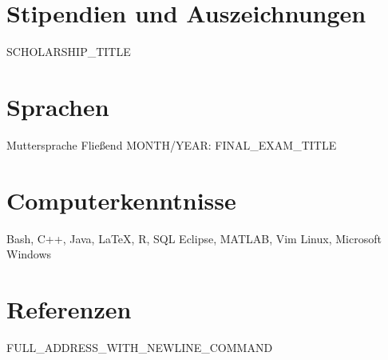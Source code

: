 \documentclass[11pt,a4paper,roman]{moderncv}
\begin{document}
\section{Stipendien und Auszeichnungen}
            {SCHOLARSHIP_TITLE}


\section{Sprachen}
            {Muttersprache}
            {}
            {Fließend}
            {MONTH/YEAR: FINAL_EXAM_TITLE}


\section{Computerkenntnisse}
            {Bash, C++, Java, \LaTeX, R, SQL}
            {}
            {}
            {Eclipse, MATLAB, Vim}
            {}
            {}
            {Linux, Microsoft Windows}
            {}
            {}

\nocite{*}


\section{Referenzen}
            {FULL_ADDRESS_WITH_NEWLINE_COMMAND}
             
\end{document}

